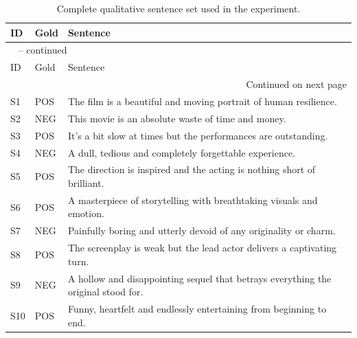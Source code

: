 \begin{longtable}{@{}llp{}@{}}
\caption{Complete qualitative sentence set used in the experiment.}\label{tab:sentences}\\
\toprule
ID & Gold & Sentence \\
\midrule
\endfirsthead
\multicolumn{3}{l}{\tablename\ \thetable{} -- continued}\\
\toprule
ID & Gold & Sentence \\
\midrule
\endhead
\midrule\multicolumn{3}{r}{Continued on next page}\\
\endfoot
\bottomrule
\endlastfoot
S1 & POS & The film is a beautiful and moving portrait of human resilience. \\
S2 & NEG & This movie is an absolute waste of time and money. \\
S3 & POS & It's a bit slow at times but the performances are outstanding. \\
S4 & NEG & A dull, tedious and completely forgettable experience. \\
S5 & POS & The direction is inspired and the acting is nothing short of brilliant. \\
S6 & POS & A masterpiece of storytelling with breathtaking visuals and emotion. \\
S7 & NEG & Painfully boring and utterly devoid of any originality or charm. \\
S8 & POS & The screenplay is weak but the lead actor delivers a captivating turn. \\
S9 & NEG & A hollow and disappointing sequel that betrays everything the original stood for. \\
S10 & POS & Funny, heartfelt and endlessly entertaining from beginning to end. \\
\end{longtable}
